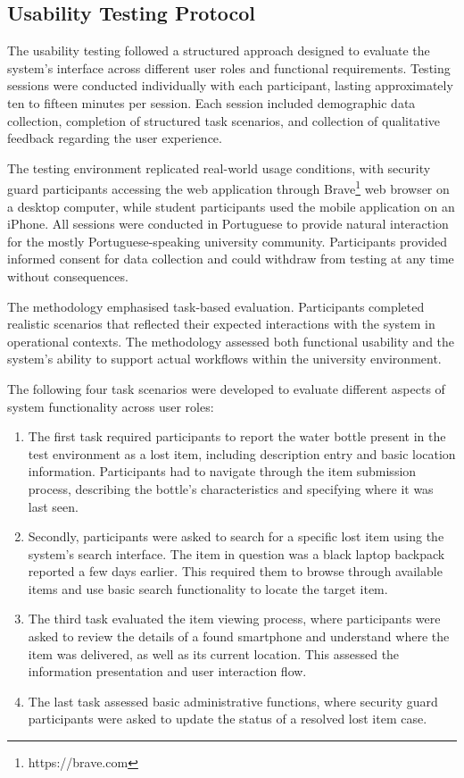\subsection{Usability Testing Protocol} \label{subsection:usability_protocol}

The usability testing followed a structured approach designed to evaluate the system's interface across different user roles and functional requirements. Testing sessions were conducted individually with each participant, lasting approximately ten to fifteen minutes per session. Each session included demographic data collection, completion of structured task scenarios, and collection of qualitative feedback regarding the user experience.

The testing environment replicated real-world usage conditions, with security guard participants accessing the web application through Brave\footnote{https://brave.com} web browser on a desktop computer, while student participants used the mobile application on an iPhone. All sessions were conducted in Portuguese to provide natural interaction for the mostly Portuguese-speaking university community. Participants provided informed consent for data collection and could withdraw from testing at any time without consequences.

The methodology emphasised task-based evaluation. Participants completed realistic scenarios that reflected their expected interactions with the system in operational contexts. The methodology assessed both functional usability and the system's ability to support actual workflows within the university environment.

The following four task scenarios were developed to evaluate different aspects of system functionality across user roles:

\begin{enumerate}
    \item The first task required participants to report the water bottle present in the test environment as a lost item, including description entry and basic location information. Participants had to navigate through the item submission process, describing the bottle's characteristics and specifying where it was last seen.
    \item Secondly, participants were asked to search for a specific lost item using the system's search interface. The item in question was a black laptop backpack reported a few days earlier. This required them to browse through available items and use basic search functionality to locate the target item.
    \item The third task evaluated the item viewing process, where participants were asked to review the details of a found smartphone and understand where the item was delivered, as well as its current location. This assessed the information presentation and user interaction flow.
    \item The last task assessed basic administrative functions, where security guard participants were asked to update the status of a resolved lost item case.
\end{enumerate}

